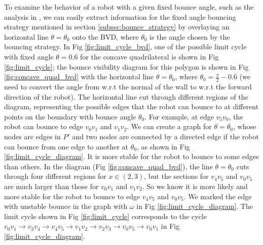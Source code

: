 \documentclass[]{svproc}  %
\begin{document}
To examine the behavior of a robot with a given fixed bounce angle, such as the
analysis in \cite{ErLav13}, we can easily extract information for the fixed angle bouncing strategy
mentioned in section \ref{subsec:bounce_strategy} by overlaying an horizontal
line $\theta = \theta_0$ onto the BVD, where $\theta_0$ is the angle chosen by
the bouncing strategy. In Fig \ref{fig:limit_cycle_bvd}, one of the possible
limit cycle with fixed angle $\theta = 0.6$ for the concave quadrilateral is
shown in Fig \ref{fig:limit_cycle}; the bounce visibility diagram for this
polygon is shown in Fig \ref{fig:concave_quad_bvd} with the horizontal line
$\theta = \theta_0$, where $\theta_0 = \frac{\pi}{2}-0.6$ (we need to convert
the angle from w.r.t the normal of the wall to w.r.t the forward direction of
the robot). The horizontal line cut through different regions of the diagram,
representing the possible edges that the robot can bounce to at different points
on the boundary with bounce angle $\theta_0$. For example, at edge $v_5v_0$, the
robot can bounce to edge $v_0v_1$ and $v_1v_2$. We can create a graph for
$\theta = \theta_0$, whose nodes are edges in $P'$ and two nodes are connected
by a directed edge if the robot can bounce from one edge to another at
$\theta_0$, as shown in Fig \ref{fig:limit_cycle_diagram}. It is more stable
for the robot to bounce to some edges than others. In the diagram
(Fig \ref{fig:concave_quad_bvd}), the line $\theta = \theta_0$ cuts through
four different regions for $x \in (2, 3)$, but the sections for $v_4v_5$ and
$v_0v_5$ are much larger than those for $v_0v_1$ and $v_1v_2$. So we know it is
more likely and more stable for the robot to bounce to edge $v_4v_5$ and
$v_0v_5$. We marked the edge with unstable bounce in the graph with $\omega$ in
Fig \ref{fig:limit_cycle_diagram}. The limit cycle shown in
Fig \ref{fig:limit_cycle} corresponds to the cycle
$v_0v_1\rightarrow v_3v_4\rightarrow v_4v_5 \rightarrow v_1v_2 \rightarrow v_2v_3 \rightarrow v_0v_5 \rightarrow v_0v_1$
in Fig \ref{fig:limit_cycle_diagram}.
\end{document}
